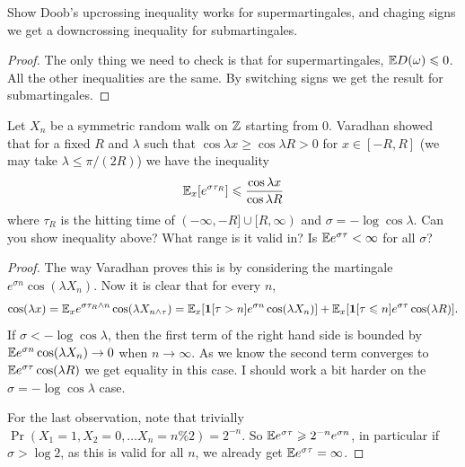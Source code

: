 \begin{exercise}
	Show Doob's upcrossing inequality works for supermartingales, and
	chaging signs
	we get a downcrossing inequality for submartingales.
\end{exercise}

\begin{proof}
	The only thing we need to check is that for supermartingales, $\mathbb{E}
	D(\omega) \leqslant 0$. All the other
	inequalities are the same. By switching signs we get the result for
	submartingales.
\end{proof}

\begin{exercise}
	Let $X_n$ be a symmetric random walk on $\mathbb{Z}$ starting from $0$.
	Varadhan showed that for a fixed $R$ and $\lambda$ such that
	$\cos \lambda x \geq \cos \lambda R > 0$ for $x \in [-R, R]$ (we
	may take $\lambda \leq \pi/(2R)$) we have
	the inequality
	\[
		\mathbb{E}_x [e^{\sigma\tau_R}] \leqslant \frac{\cos \lambda x}{\cos \lambda R}
	\]
	where $\tau_R$ is the hitting time of $(-\infty, -R] \cup [R,
	\infty)$ and $\sigma = -\log \cos \lambda$.
	Can you show inequality above? What range is it valid in? Is $\mathbb{E}
	e^{\sigma \tau} < \infty$ for all $\sigma$?
\end{exercise}
\begin{proof}
	The way Varadhan proves this is by considering the martingale
	$e^{\sigma n} \cos(\lambda X_n)$.
	Now it is clear that for every $n$,
	\[
		\cos(\lambda x) = \mathbb{E}_x e^{\sigma \tau_R \land n} \cos(\lambda
		X_{n \land \tau}) =
		\mathbb{E}_x[\bm{1}[\tau > n] e^{\sigma n} \cos(\lambda X_n)] +
		\mathbb{E}_x[\bm{1}[\tau \leqslant n] e^{\sigma \tau} \cos(\lambda R)].
	\]
	If $\sigma < -\log \cos \lambda$, then the first term of the right
	hand side is bounded by
	$\mathbb{E} e^{\sigma n} \cos(\lambda X_n) \rightarrow 0$ when $n \to \infty$. As
	we know the second
	term converges to $\mathbb{E} e^{\sigma \tau} \cos(\lambda R)$ we get
	equality in this case.
	I should work a bit harder on the $\sigma = -\log \cos \lambda$ case.

	For the last observation, note that trivially $\Pr(X_1 = 1, X_2 = 0,
	\dots X_n = n\%2) = 2^{-n}$.
	So $\mathbb{E} e^{\sigma \tau} \geqslant 2^{-n}e^{\sigma n}$, in particular if
	$\sigma > \log 2$, as this is valid for all $n$,
	we already get $\mathbb{E} e^{\sigma \tau} = \infty$.
\end{proof}
